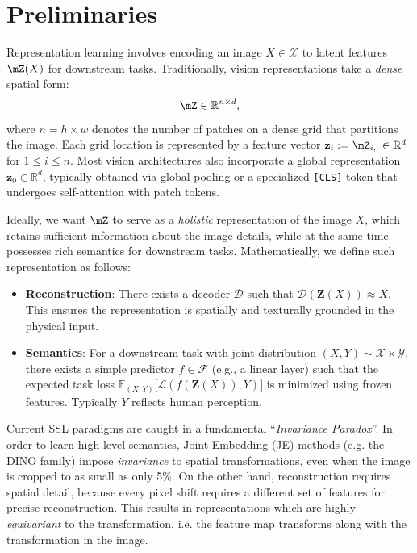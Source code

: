 \section{Preliminaries}
Representation learning involves encoding an image $X \in \mathcal{X}$ to latent features $\mZ(X)$ for downstream tasks. Traditionally, vision representations take a \textit{dense} spatial form:
\[
\mZ \in \mathbb{R}^{n \times d},
\]
where $n = h \times w$ denotes the number of patches on a dense grid that partitions the image. Each grid location is represented by a feature vector $\mathbf{z}_i := \mZ_{i,:} \in \mathbb{R}^d$ for $1 \leq i \leq n$. Most vision architectures also incorporate a global representation $\mathbf{z}_0 \in \mathbb{R}^d$, typically obtained via global pooling or a specialized \texttt{[CLS]} token that undergoes self-attention with patch tokens.


Ideally, we want $\mZ$ to serve as a \textit{holistic} representation of the image $X$, which retains sufficient information about the image details, while at the same time possesses rich semantics for downstream tasks. Mathematically, we define such representation as follows:

\begin{itemize}
    \item \textbf{Reconstruction}: There exists a decoder $\mathcal{D}$ such that $\mathcal{D}(\mathbf{Z}(X)) \approx X$. This ensures the representation is spatially and texturally grounded in the physical input.
    \item \textbf{Semantics}: For a downstream task with joint distribution $(X, Y) \sim \mathcal{X} \times \mathcal{Y}$, there exists a simple predictor $f \in \mathcal{F}$ (e.g., a linear layer) such that the expected task loss $\mathbb{E}_{(X,Y)} \big[ \mathcal{L}(f(\mathbf{Z}(X)), Y) \big]$ is minimized using frozen features. Typically $Y$ reflects human perception.
\end{itemize}



Current SSL paradigms are caught in a fundamental ``\textit{Invariance Paradox}''. In order to learn high-level semantics, Joint Embedding (JE) methods (e.g. the DINO family) impose \textit{invariance} to spatial transformations, even when the image is cropped to as small as only 5\%.  On the other hand, reconstruction requires spatial detail, because every pixel shift requires a different set of features for precise reconstruction. This results in representations which are highly \textit{equivariant} to the transformation, i.e. the feature map transforms along with the transformation in the image.

